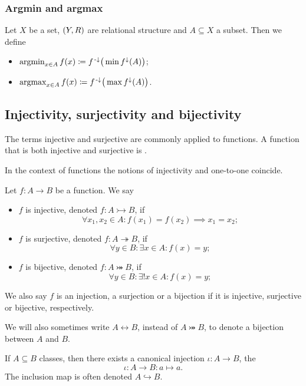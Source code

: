 \subsubsection{Argmin and argmax}
\begin{definition}
Let $X$ be a set, $\sSet{Y,R}$ are relational structure and $A\subseteq X$ a subset. Then we define
\begin{itemize}
\item $\operatorname{argmin}_{x\in A}f(x) \coloneqq f^{\text{\hspace{0.15em}-}\downarrow}\big(\min f^\downarrow(A)\big)$;
\item $\operatorname{argmax}_{x\in A}f(x) \coloneqq f^{\text{\hspace{0.15em}-}\downarrow}\big(\max f^\downarrow(A)\big)$.
\end{itemize}
\end{definition}

\subsection{Injectivity, surjectivity and bijectivity}
\begin{definition}
The terms injective and surjective are commonly applied to functions. A function that is both injective and surjective is .
\end{definition}
In the context of functions the notions of injectivity and one-to-one coincide.
\begin{lemma}
Let $f:A\to B$ be a function. We say
\begin{itemize}
\item $f$ is injective, denoted $f: A\rightarrowtail B$, if
\[ \forall x_1,x_2\in A: f(x_1) = f(x_2) \implies x_1 = x_2; \]
\item $f$ is surjective, denoted $f: A\twoheadrightarrow B$, if
\[ \forall y\in B: \exists x\in A: f(x) = y; \]
\item $f$ is bijective, denoted $f: A\twoheadrightarrowtail B$, if
\[ \forall y\in B: \exists! x\in A: f(x) = y; \]
\end{itemize}
We also say $f$ is an injection, a surjection or a bijection if it is injective, surjective or bijective, respectively.

We will also sometimes write $A \leftrightarrow B$, instead of $A\twoheadrightarrowtail B$, to denote a bijection between $A$ and $B$.
\end{lemma}

\begin{lemma}
If $A\subseteq B$ classes, then there exists a canonical injection $\iota: A\to B$, the 
\[ \iota: A\to B: a\mapsto a. \]
The inclusion map is often denoted $A\hookrightarrow B$.
\end{lemma}

